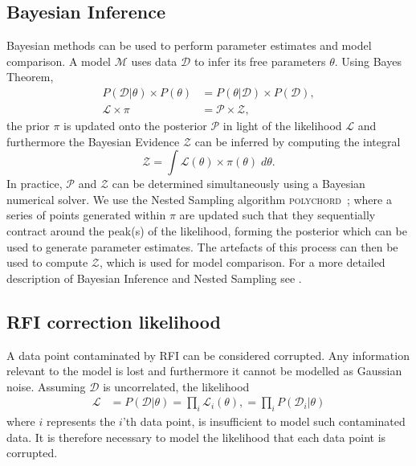 \documentclass[fleqn,usenatbib]{mnras}
\begin{document}
\subsection{Bayesian Inference}\label{sec:bayesianinftheory}
Bayesian methods can be used to perform parameter estimates and model comparison. A model $\mathcal{M}$ uses data $\mathcal{D}$ to infer its free parameters $\theta$. Using Bayes Theorem,
\begin{align}
    P(\mathcal{D}|\theta) \times P(\theta) &= P(\theta|\mathcal{D}) \times P(\mathcal{D}), \\
    \mathcal{L} \times \pi &= \mathcal{P} \times \mathcal{Z},
\end{align}
the prior $\pi$ is updated onto the posterior $\mathcal{P}$ in light of the likelihood $\mathcal{L}$ and furthermore the Bayesian Evidence $\mathcal{Z}$ can be inferred by computing the integral
\begin{equation}
    \mathcal{Z} = \int \mathcal{L}(\theta) \times \pi(\theta) \; d\theta.
\end{equation}
In practice, $\mathcal{P}$ and $\mathcal{Z}$ can be determined simultaneously using a Bayesian numerical solver. We use the Nested Sampling algorithm \textsc{polychord}~\cite{handley2015polychord}; where a series of points generated within $\pi$ are updated such that they sequentially contract around the peak(s) of the likelihood, forming the posterior which can be used to generate parameter estimates. The artefacts of this process can then be used to compute $\mathcal{Z}$, which is used for model comparison. For a more detailed description of Bayesian Inference and Nested Sampling see \cite{sivia2006data}.

\subsection{RFI correction likelihood}\label{sec:rficorrtheory}
A data point contaminated by RFI can be considered corrupted. Any information relevant to the model is lost and furthermore it cannot be modelled as Gaussian noise. Assuming $\mathcal{D}$ is uncorrelated, the likelihood
\begin{equation}
\begin{aligned}
   \mathcal{L} &= P(\mathcal{D}|\theta) = \prod_{i} \mathcal{L}_{i}(\theta),\label{l1} = \prod_{i} P(\mathcal{D}_i|\theta)
\end{aligned}
\end{equation}
where $i$ represents the $i$'th data point, is insufficient to model such contaminated data.
It is therefore necessary to model the likelihood that each data point is corrupted. 
\end{document}
